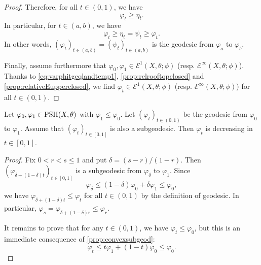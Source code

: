 \begin{proof}
    Therefore, for all $t\in (0,1)$, we have
    \[
    \varphi_t\geq \eta_t.
    \]
    In particular, for $t\in (a,b)$, we have
    \[
    \varphi_t\geq \eta_t=\psi_t\geq \varphi_t.
    \]
    In other words, $(\varphi_t)_{t\in (a,b)}=(\psi_t)_{t\in (a,b)}$ is the geodesic from $\varphi_a$ to $\varphi_b$.

    Finally, assume furthermore that $\varphi_0,\varphi_1\in \mathcal{E}^1(X,\theta;\phi)$ (resp. $\mathcal{E}^{\infty}(X,\theta;\phi)$). Thanks to \eqref{eq:varphitgeqlandtemp1}, \cref{prop:relrooftopclosed} and \cref{prop:relativeEupperclosed}, we find $\varphi_t\in \mathcal{E}^1(X,\theta;\phi)$ (resp. $\mathcal{E}^{\infty}(X,\theta;\phi)$) for all $t\in (0,1)$.
\end{proof}

\begin{lemma}\label{lma:geoddecreasing}
    Let $\varphi_0,\varphi_1\in \mathrm{PSH}(X,\theta)$ with $\varphi_1\leq \varphi_0$. Let $(\varphi_t)_{t\in (0,1)}$ be the geodesic from $\varphi_0$ to $\varphi_1$. Assume that $(\varphi_t)_{t\in [0,1]}$ is also a subgeodesic. Then $\varphi_t$ is decreasing in $t\in [0,1]$.
\end{lemma}
\begin{proof}
    Fix $0< r<s\leq 1$ and put $\delta=(s-r)/(1-r)$. Then $(\varphi_{\delta+(1-\delta)t})_{t\in [0,1]}$ is a subgeodesic from $\varphi_\delta$ to $\varphi_1$. Since
    \[
    \varphi_\delta\leq (1-\delta)\varphi_0+\delta\varphi_1\leq \varphi_0,
    \]
    we have $\varphi_{\delta+(1-\delta)t}\leq \varphi_t$ for all $t\in (0,1)$ by the definition of geodesic. In particular, $\varphi_s=\varphi_{\delta+(1-\delta)r}\leq \varphi_r$.

    It remains to prove that for any $t\in (0,1)$, we have $\varphi_t\leq \varphi_0$, but this is an immediate consequence of \cref{prop:convexsubgeod}:
    \[
        \varphi_t\leq t\varphi_1+(1-t)\varphi_0\leq \varphi_0.
    \]
\end{proof}




